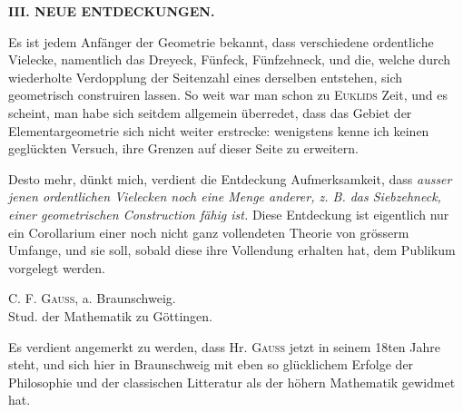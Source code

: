 \NoSourceHead
{}
\begin{center}\textbf{III. NEUE ENTDECKUNGEN.}\end{center}

Es ist jedem Anfänger der Geometrie bekannt, dass verschiedene ordentliche Vielecke, namentlich das Dreyeck, Fünfeck, Fünfzehneck, und die, welche durch wiederholte Verdopplung der Seitenzahl eines derselben entstehen, sich geometrisch construiren lassen. So weit war man schon zu \textsc{Euklids} Zeit, und es scheint, man habe sich seitdem allgemein überredet, dass das Gebiet der Elementargeometrie sich nicht weiter erstrecke: wenigstens kenne ich keinen geglückten Versuch, ihre Grenzen auf dieser Seite zu erweitern.

Desto mehr, dünkt mich, verdient die Entdeckung Aufmerksamkeit, dass \textit{ausser jenen ordentlichen Vielecken noch eine Menge anderer, z. B. das Siebzehneck, einer geometrischen Construction fähig ist.} Diese Entdeckung ist eigentlich nur ein Corollarium einer noch nicht ganz vollendeten Theorie von grösserm Umfange, und sie soll, sobald diese ihre Vollendung erhalten hat, dem Publikum vorgelegt werden.

\begin{center}
C. F. \textsc{Gauss}, a. Braunschweig.\\
Stud. der Mathematik zu Göttingen.
\end{center}
\ClosingRule

Es verdient angemerkt zu werden, dass Hr. \textsc{Gauss} jetzt in seinem 18ten Jahre steht, und sich hier in Braunschweig mit eben so glücklichem Erfolge der Philosophie und der classischen Litteratur als der höhern Mathematik gewidmet hat.

